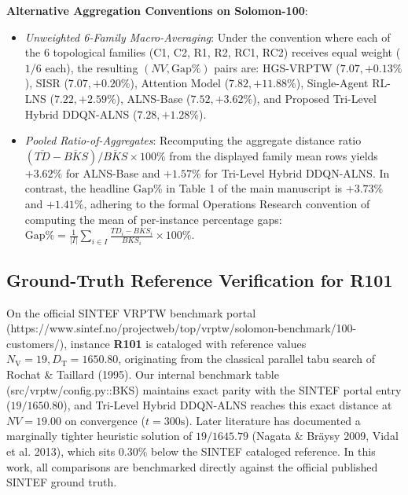 \documentclass{article}
\newcommand{\NV}{{N_\mathrm{V}}}
\newcommand{\TD}{{D_\mathrm{T}}}
\begin{document}
\noindent\textbf{Alternative Aggregation Conventions on Solomon-100}:
\begin{itemize}
    \item \textit{Unweighted 6-Family Macro-Averaging}: Under the convention where each of the 6 topological families (C1, C2, R1, R2, RC1, RC2) receives equal weight ($1/6$ each), the resulting $(NV, \text{Gap\%})$ pairs are: HGS-VRPTW ($7.07, +0.13\%$), SISR ($7.07, +0.20\%$), Attention Model ($7.82, +11.88\%$), Single-Agent RL-LNS ($7.22, +2.59\%$), ALNS-Base ($7.52, +3.62\%$), and Proposed Tri-Level Hybrid DDQN-ALNS ($7.28, +1.28\%$).
    \item \textit{Pooled Ratio-of-Aggregates}: Recomputing the aggregate distance ratio $(\overline{TD} - \overline{BKS}) / \overline{BKS} \times 100\%$ from the displayed family mean rows yields $+3.62\%$ for ALNS-Base and $+1.57\%$ for Tri-Level Hybrid DDQN-ALNS. In contrast, the headline $\text{Gap\%}$ in Table 1 of the main manuscript is $+3.73\%$ and $+1.41\%$, adhering to the formal Operations Research convention of computing the mean of per-instance percentage gaps: $\text{Gap\%} = \frac{1}{|I|}\sum_{i \in I} \frac{TD_i - BKS_i}{BKS_i} \times 100\%$.
\end{itemize}

\subsection{Ground-Truth Reference Verification for R101}
On the official SINTEF VRPTW benchmark portal (\textsf{https://www.sintef.no/projectweb/top/vrptw/solomon-benchmark/100-customers/}), instance \textbf{R101} is cataloged with reference values $\NV=19, \TD=1650.80$, originating from the classical parallel tabu search of Rochat \& Taillard (1995). Our internal benchmark table (\textsf{src/vrptw/config.py::BKS}) maintains exact parity with the SINTEF portal entry ($19/1650.80$), and Tri-Level Hybrid DDQN-ALNS reaches this exact distance at $NV=19.00$ on convergence ($t=300\text{s}$). Later literature has documented a marginally tighter heuristic solution of $19/1645.79$ (Nagata \& Bräysy 2009, Vidal et al. 2013), which sits $0.30\%$ below the SINTEF cataloged reference. In this work, all comparisons are benchmarked directly against the official published SINTEF ground truth.
\end{document}
